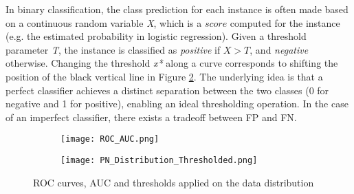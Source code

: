 In binary classification, the class prediction for each instance is often made based on a continuous random variable \textit{X}, which is a $score$ computed for the instance (e.g. the estimated probability in logistic regression). 
Given a threshold parameter \textit{T}, the instance is classified as \textit{positive} if $X > T$, and \textit{negative} otherwise. 
Changing the threshold \textit{x*} along a curve corresponds to shifting the position of the black vertical line in Figure \ref{fig:PNDistribution}. 
The underlying idea is that a perfect classifier achieves a distinct separation between the two classes (0 for negative and 1 for positive), enabling an ideal thresholding operation.
In the case of an imperfect classifier, there exists a tradeoff between FP and FN.
\begin{figure}[H]
  \centering
  \begin{subfigure}{0.8\linewidth}
    \texttt{[image: ROC\_AUC.png]}
    \caption{}
    \label{fig:ROC_AUC}
  \end{subfigure}
  \begin{subfigure}{0.8\linewidth}
    \texttt{[image: PN\_Distribution\_Thresholded.png]}
    \caption{}
    \label{fig:PNDistribution}
  \end{subfigure}
  \caption{ROC curves, AUC and thresholds applied on the data distribution}
  \label{fig:ROC}
\end{figure}
